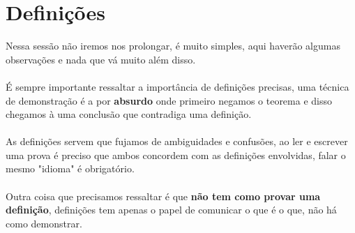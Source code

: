 \documentclass[main.tex]{subfiles}
\begin{document}
\section{Definições}
Nessa sessão não iremos nos prolongar, é muito simples, aqui haverão algumas observações e nada que vá muito além disso.
\\ \\
É sempre importante ressaltar a importância de definições precisas, uma técnica de demonstração é a por \textbf{absurdo} onde primeiro negamos o teorema e disso chegamos à uma conclusão que contradiga uma definição.
\\ \\
As definições servem que fujamos de ambiguidades e confusões, ao ler e escrever uma prova é preciso que ambos concordem com as definições envolvidas, falar o mesmo "idioma" é obrigatório.
\\ \\
Outra coisa que precisamos ressaltar é que \textbf{não tem como provar uma definição}, definições tem apenas o papel de comunicar o que é o que, não há como demonstrar.
\end{document}
